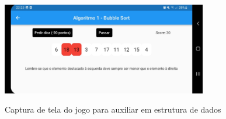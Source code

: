 \begin{figure}[H]
	\centering
	\caption{Captura de tela do jogo para auxiliar em estrutura de dados}
	\includegraphics[width=0.8\textwidth]{images/aux-ed.png}
	\label{fig:aux_ed}
\end{figure}
